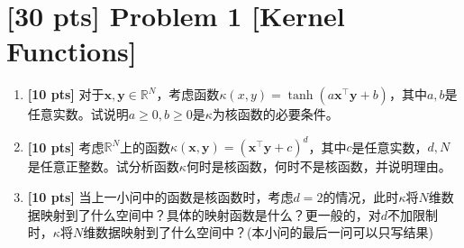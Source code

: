 \documentclass[a4paper,UTF8]{article}
\theoremstyle{definition}
\begin{document}
\newpage

\section*{\textbf{[30 pts]} Problem	 1 [Kernel Functions]}

\begin{enumerate}[(1)]
	\item \textbf{[10 pts]} 对于$\bm{x},\bm{y} \in \mathbb{R}^N$，考虑函数$\kappa(x,y) = \tanh( a \bm{x}^\top \bm{y} + b)$，其中$a,b$是任意实数。试说明$a \geqslant 0,b \geqslant 0$是$\kappa$为核函数的必要条件。
	\item \textbf{[10 pts]} 考虑$ \mathbb{R}^N $上的函数$ \kappa(\bm{x},\bm{y}) = (\bm{x}^\top \bm{y} + c)^d $，其中$c$是任意实数，$d,N$是任意正整数。试分析函数$\kappa$何时是核函数，何时不是核函数，并说明理由。
	\item \textbf{[10 pts]} 当上一小问中的函数是核函数时，考虑$d=2$的情况，此时$\kappa$将$N$维数据映射到了什么空间中？具体的映射函数是什么？更一般的，对$d$不加限制时，$\kappa$将$N$维数据映射到了什么空间中？(本小问的最后一问可以只写结果)
\end{enumerate}
\end{document}

